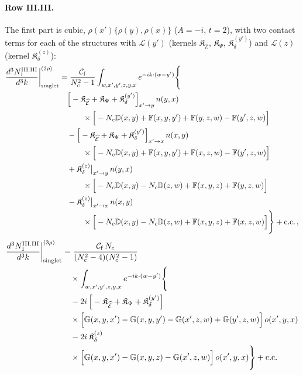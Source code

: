 \paragraph{Row III.III.} The first part is cubic, $\rho(x')\{\rho(y),\rho(x)\}$ ($A=-i$, $t=2$), with two contact terms for each of the structures with $\mathcal L(y')$ (kernels $\mathfrak K_{\widehat{\mathcal E}}$, $\mathfrak K_\Psi$, $\mathfrak K_\delta^{(y')}$) and $\mathcal L(z)$ (kernel $\mathfrak K_\delta^{(z)}$):
\begin{align}\label{eq:sIIIIII1}
\frac{d^3N^{\rm III.III}_1}{d^3k}\bigg|^{(2\rho)}_{\rm singlet}&=\frac{\mathcal C_{\rm f}}{N_c^2-1}\int_{w,x',y',z,y,x}e^{-ik\cdot(w-y')}\Bigg\{\notag\\
&\quad\Big[-\mathfrak K_{\widehat{\mathcal E}}+\mathfrak K_\Psi+\mathfrak K_\delta^{(y')}\Big]_{x'\to y}\,n(y,x)\notag\\
&\qquad\quad\times\Big[-N_c\mathbb{D}(x,y)+\mathbb{F}(x,y,y')+\mathbb{F}(y,z,w)-\mathbb{F}(y',z,w)\Big]\notag\\
&\quad-\Big[-\mathfrak K_{\widehat{\mathcal E}}+\mathfrak K_\Psi+\mathfrak K_\delta^{(y')}\Big]_{x'\to x}\,n(x,y)\notag\\
&\qquad\quad\times\Big[-N_c\mathbb{D}(x,y)+\mathbb{F}(x,y,y')+\mathbb{F}(x,z,w)-\mathbb{F}(y',z,w)\Big]\notag\\
&\quad+\mathfrak K_\delta^{(z)}\big|_{x'\to y}\,n(y,x)\notag\\
&\qquad\quad\times\Big[-N_c\mathbb{D}(x,y)-N_c\mathbb{D}(z,w)+\mathbb{F}(x,y,z)+\mathbb{F}(y,z,w)\Big]\notag\\
&\quad-\mathfrak K_\delta^{(z)}\big|_{x'\to x}\,n(x,y)\notag\\
&\qquad\quad\times\Big[-N_c\mathbb{D}(x,y)-N_c\mathbb{D}(z,w)+\mathbb{F}(x,y,z)+\mathbb{F}(x,z,w)\Big]\Bigg\}+{\rm c.c.}\,,
\end{align}
\begin{align}\label{eq:oIIIIII1}
\frac{d^3N^{\rm III.III}_1}{d^3k}\bigg|^{(3\rho)}_{\rm singlet}&=\frac{\mathcal C_{\rm f}\,N_c}{(N_c^2-4)(N_c^2-1)}\notag\\
&\quad\times\int_{w,x',y',z,y,x}e^{-ik\cdot(w-y')}\Bigg\{\notag\\
&\quad-2i\,\Big[-\mathfrak K_{\widehat{\mathcal E}}+\mathfrak K_\Psi+\mathfrak K_\delta^{(y')}\Big]\notag\\
&\quad\times\Big[\mathbb{G}(x,y,x')-\mathbb{G}(x,y,y')-\mathbb{G}(x',z,w)+\mathbb{G}(y',z,w)\Big]\,o(x',y,x)\notag\\
&\quad-2i\,\mathfrak K_\delta^{(z)}\notag\\
&\quad\times\Big[\mathbb{G}(x,y,x')-\mathbb{G}(x,y,z)-\mathbb{G}(x',z,w)\Big]\,o(x',y,x)\Bigg\}+{\rm c.c.}
\end{align}
